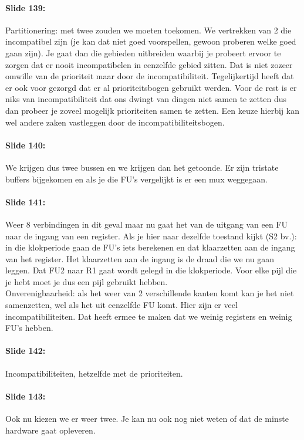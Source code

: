 \documentclass[10pt,a4paper]{book}
\begin{document}
\paragraph{Slide 139:} Partitionering: met twee zouden we moeten toekomen. We vertrekken van 2 die incompatibel zijn (je kan dat niet goed voorspellen, gewoon proberen welke goed gaan zijn). Je gaat dan die gebieden uitbreiden waarbij je probeert ervoor te zorgen dat er nooit incompatibelen in eenzelfde gebied zitten. Dat is niet zozeer omwille van de prioriteit maar door de incompatibiliteit. Tegelijkertijd heeft dat er ook voor gezorgd dat er al prioriteitsbogen gebruikt werden. Voor de rest is er niks van incompatibiliteit dat ons dwingt van dingen niet samen te zetten dus dan probeer je zoveel mogelijk prioriteiten samen te zetten. Een keuze hierbij kan wel andere zaken vastleggen door de incompatibiliteitsbogen.

\paragraph{Slide 140:} We krijgen dus twee bussen en we krijgen dan het getoonde. Er zijn tristate buffers bijgekomen en als je die FU's vergelijkt is er een mux weggegaan. 

\paragraph{Slide 141:} Weer 8 verbindingen in dit geval maar nu gaat het van de uitgang van een FU naar de ingang van een register. Als je hier naar dezelfde toestand kijkt (S2 bv.): in die klokperiode gaan de FU's iets berekenen en dat klaarzetten aan de ingang van het register. Het klaarzetten aan de ingang is de draad die we nu gaan leggen. Dat FU2 naar R1 gaat wordt gelegd in die klokperiode. Voor elke pijl die je hebt moet je dus een pijl gebruikt hebben.\\
Onverenigbaarheid: als het weer van 2 verschillende kanten komt kan je het niet samenzetten, wel als het uit eenzelfde FU komt. Hier zijn er veel incompatibiliteiten. Dat heeft ermee te maken dat we weinig registers en weinig FU's hebben.

\paragraph{Slide 142:} Incompatibiliteiten, hetzelfde met de prioriteiten.

\paragraph{Slide 143:} Ook nu kiezen we er weer twee. Je kan nu ook nog niet weten of dat de minste hardware gaat opleveren.
\end{document}
